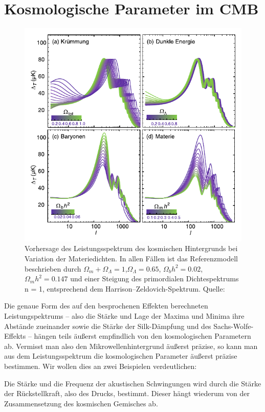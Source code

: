 \documentclass[10pt,a4paper]{article}
\begin{document}
\section{Kosmologische Parameter im CMB}
\begin{figure}
\center
\includegraphics[scale=1]{cmbvar}
\caption{Vorhersage des Leistungsspektrum des kosmischen Hintergrunds bei Variation der Materiedichten. In allen Fällen ist das Referenzmodell beschrieben durch $\Omega_m + \Omega_\Lambda = 1$,$\Omega_\Lambda = 0.65$, $\Omega_b h^2 = 0.02$, $\Omega_m h^2 = 0.147$ und einer Steigung des primordialen Dichtespektrums n = 1, entsprechend dem Harrison–Zeldovich-Spektrum. Quelle: \cite{Schneider}}
\label{cmbvar}
\end{figure}
Die genaue Form des auf den besprochenen Effekten berechneten Leistungspektrums -- also die Stärke und Lage der Maxima und Minima ihre Abstände zueinander sowie die Stärke der Silk-Dämpfung und des Sachs-Wolfe-Effekts -- hängen teils äußerst empfindlich von den kosmologischen Parametern ab. Vermisst man also den Mikrowellenhintergrund äußerst präzise, so kann man aus dem Leistungsspektrum die kosmologischen Parameter äußerst präzise bestimmen.
Wir wollen dies an zwei Beispielen verdeutlichen:

Die Stärke und die Frequenz der akustischen Schwingungen wird durch die Stärke der Rückstellkraft, also des Drucks, bestimmt. Dieser hängt wiederum von der Zusammensetzung des kosmischen Gemisches ab.\cite{S+W00}
\end{document}
